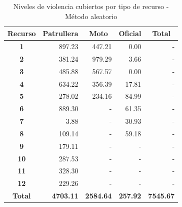 \begin{table}
\centering
\caption{Niveles de violencia cubiertos por tipo de recurso - Método aleatorio}
\label{table:resultados-estocastico}
\begin{tabular}{crrrr}
\toprule
\textbf{Recurso} & \multicolumn{1}{c}{\textbf{Patrullera}} & \multicolumn{1}{c}{\textbf{Moto}} & \multicolumn{1}{c}{\textbf{Oficial}} & \multicolumn{1}{c}{\textbf{Total}} \\ \hline
\textbf{1}       & 897.23                                  & 447.21                            & 0.00                                 & -                                  \\
\textbf{2}       & 381.24                                  & 979.29                            & 3.66                                 & -                                  \\
\textbf{3}       & 485.88                                  & 567.57                            & 0.00                                 & -                                  \\
\textbf{4}       & 634.22                                  & 356.39                            & 17.81                                & -                                  \\
\textbf{5}       & 278.02                                  & 234.16                            & 84.99                                & -                                  \\
\textbf{6}       & 889.30                                  & -                                 & 61.35                                & -                                  \\
\textbf{7}       & 3.88                                    & -                                 & 30.93                                & -                                  \\
\textbf{8}       & 109.14                                  & -                                 & 59.18                                & -                                  \\
\textbf{9}       & 179.11                                  & -                                 & -                                    & -                                  \\
\textbf{10}      & 287.53                                  & -                                 & -                                    & -                                  \\
\textbf{11}      & 328.30                                  & -                                 & -                                    & -                                  \\
\textbf{12}      & 229.26                                  & -                                 & -                                    & -                                  \\ \hline
\textbf{Total}   & \textbf{4703.11}                        & \textbf{2584.64}                  & \textbf{257.92}                      & \textbf{7545.67}                   \\
\bottomrule
\end{tabular}
\end{table}
